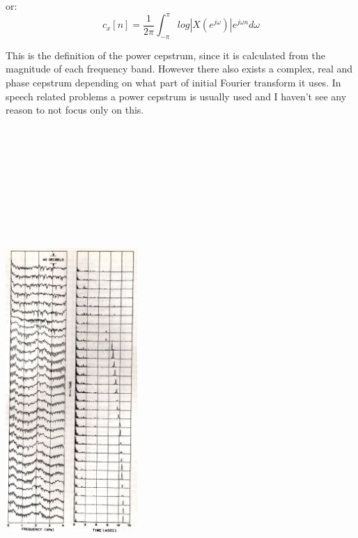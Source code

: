\documentclass[12pt,a4paper,english]{article}
\begin{document}
or:
\begin{equation}
    c_x[n] = \frac{1}{2\pi} \int_{-\pi}^{\pi}log |X(e^{j \omega})| e^{j \omega n} d\omega
\end{equation}

This is the definition of the power cepstrum, since it is calculated from the magnitude of each frequency band. However there also exists a complex, real and phase cepstrum depending on what part of initial Fourier transform it uses.
In speech related problems a power cepstrum is usually used and I haven't see any reason to not focus only on this.


\newpage
\addtolength{\textwidth}{6cm}

\begin{minipage}[-200,0]{5cm}
    \includegraphics[width=5cm,height=20cm]{vowel_cepstrum.jpg}
\end{minipage}
\end{document}
